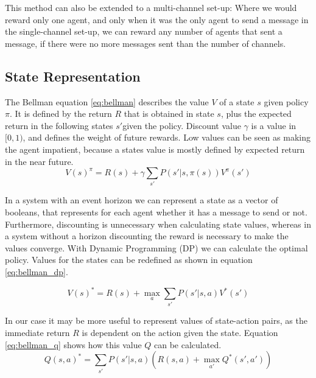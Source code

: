\documentclass{article}
\begin{document}
\begin{multicols}{2}
		This method can also be extended to a multi-channel set-up: Where we
		would reward only one agent, and only when it was the only agent to send a
		message in the single-channel set-up, we can reward any number of agents
		that sent a message, if there were no more messages sent than the number
		of channels.

		\subsection{State Representation}
		\label{sub:state_representation}
		The Bellman equation \ref{eq:bellman} describes the value $V$ of a state
		$s$ given policy $\pi$. It is defined by the return $R$ that is obtained in
		state $s$, plus the expected return in the following states $s'$given the
		policy. Discount value $\gamma$ is a value in $[0, 1)$, and defines the
		weight of future rewards. Low values can be seen as making the agent
		impatient, because a states value is mostly defined by expected return in
		the near future.
		\begin{equation}
		\displaystyle
		V(s)^\pi = R(s) + \gamma\sum_{s'} P(s'|s, \pi(s)) V^\pi(s')
		\label{eq:bellman}
		\end{equation}

		In a system with an event horizon we can represent a state as a vector of
		booleans, that represents for each agent whether it has a message to send
		or not. Furthermore, discounting is unnecessary when calculating state
		values, whereas in a system without a horizon discounting the reward is
		necessary to make the values converge. With Dynamic Programming (DP) we
		can calculate the optimal policy. Values for the states can be redefined
		as shown in equation \ref{eq:bellman_dp}.

		\begin{equation}
		\displaystyle
		V(s)^* = R(s) + \max_a \sum_{s'} P(s'|s, a) V^*(s')
		\label{eq:bellman_dp}
		\end{equation}

		In our case it may be more useful to represent values of state-action
		pairs, as the immediate return $R$ is dependent on the action given the
		state. Equation \ref{eq:bellman_q} shows how this value $Q$ can be
		calculated.
		\begin{equation}
		\displaystyle
		Q(s, a)^* = \sum_{s'} P(s'|s, a) \left(R(s, a) + \max_{a'} Q^*(s', a')\right)
		\label{eq:bellman_q}
		\end{equation}


\end{multicols}
\end{document}
